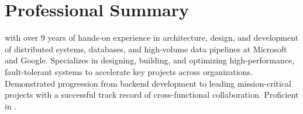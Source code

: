 \section{Professional Summary}
\normalsize{\POSITION{} with over 9 years of hands-on experience in architecture, design, and development of distributed systems, databases, and high-volume data pipelines at Microsoft and Google. Specializes in designing, building, and optimizing high-performance, fault-tolerant systems to accelerate key projects across organizations. Demonstrated progression from backend development to leading mission-critical projects with a successful track record of cross-functional collaboration. Proficient in \LanguagesOrderSummary\MainTechnologies.}
